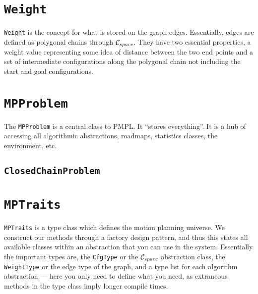 \section{\texttt{Weight}}

\texttt{Weight} is the concept for what is stored on the graph edges.
Essentially, edges are defined as polygonal chains through $\mathcal{C}_{space}$. They have
two essential properties, a weight value representing some idea of distance
between the two end points and a set of intermediate configurations along the
polygonal chain not including the start and goal configurations.

\section{\texttt{MPProblem}}

The \texttt{MPProblem} is a central class to PMPL. It ``stores everything''. It
is a hub of accessing all algorithmic abstractions, roadmaps, statistics
classes, the environment, etc.

\subsection{\texttt{ClosedChainProblem}}

\section{\texttt{MPTraits}}

\texttt{MPTraits} is a type class which defines the motion planning universe. We
construct our methods through a factory design pattern, and thus this states all
available classes within an abstraction that you can use in the system.
Essentially the important types are, the \texttt{CfgType} or the $\mathcal{C}_{space}$
abstraction class, the \texttt{WeightType} or the edge type of the graph, and a
type list for each algorithm abstraction --- here you only need to define what
you need, as extraneous methods in the type class imply longer compile times.

